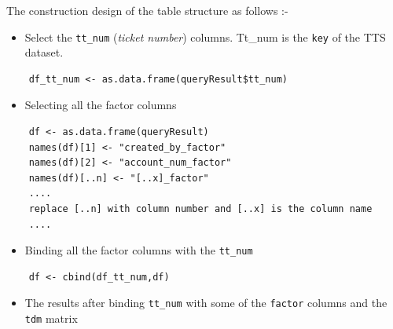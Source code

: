 \documentclass[]{article}
\providecommand{\tightlist}{%
  \setlength{\itemsep}{0pt}\setlength{\parskip}{0pt}}
\begin{document}
The construction design of the table structure as follows :-

\begin{itemize}
\tightlist
\item
  Select the \texttt{tt\_num} (\emph{ticket number}) columns. Tt\_num is
  the \texttt{key} of the TTS dataset.
\end{itemize}

\begin{verbatim}
    df_tt_num <- as.data.frame(queryResult$tt_num)
\end{verbatim}

\begin{itemize}
\tightlist
\item
  Selecting all the factor columns
\end{itemize}

\begin{verbatim}
    df <- as.data.frame(queryResult)
    names(df)[1] <- "created_by_factor"
    names(df)[2] <- "account_num_factor"
    names(df)[..n] <- "[..x]_factor"
    ....
    replace [..n] with column number and [..x] is the column name
    ....
\end{verbatim}

\begin{itemize}
\tightlist
\item
  Binding all the factor columns with the \texttt{tt\_num}
\end{itemize}

\begin{verbatim}
    df <- cbind(df_tt_num,df)
\end{verbatim}

\begin{itemize}
\tightlist
\item
  The results after binding \texttt{tt\_num} with some of the
  \texttt{factor} columns and the \texttt{tdm} matrix
\end{itemize}
\end{document}
